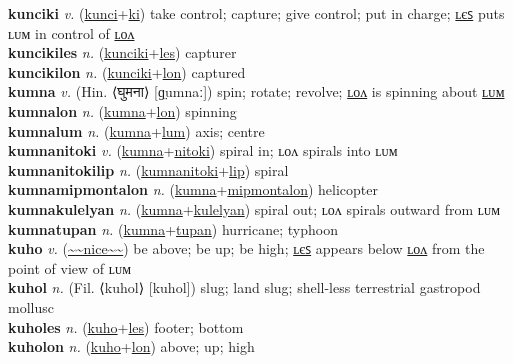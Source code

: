 \textbf{kunciki} \textit{v.} (\hyperref[kunci]{kunci}+\hyperref[ki]{ki})
take control; capture; give control; put in charge; \hyperref[kuncikiles]{ʟєꜱ} puts ʟᴜᴍ in control of \hyperref[kuncikilon]{ʟᴏᴧ} \label{kunciki} \\
\textbf{kuncikiles} \textit{n.} (\hyperref[kunciki]{kunciki}+\hyperref[les]{les})
capturer \label{kuncikiles} \\
\textbf{kuncikilon} \textit{n.} (\hyperref[kunciki]{kunciki}+\hyperref[lon]{lon})
captured \label{kuncikilon} \\
\textbf{kumna} \textit{v.} (Hin. ⟨घुमना⟩ [ɡ̤umnaː])
spin; rotate; revolve; \hyperref[kumnalon]{ʟᴏᴧ} is spinning about \hyperref[kumnalum]{ʟᴜᴍ} \label{kumna} \\
\textbf{kumnalon} \textit{n.} (\hyperref[kumna]{kumna}+\hyperref[lon]{lon})
spinning \label{kumnalon} \\
\textbf{kumnalum} \textit{n.} (\hyperref[kumna]{kumna}+\hyperref[lum]{lum})
axis; centre \label{kumnalum} \\
\textbf{kumnanitoki} \textit{v.} (\hyperref[kumna]{kumna}+\hyperref[nitoki]{nitoki})
spiral in; ʟᴏᴧ spirals into ʟᴜᴍ \label{kumnanitoki} \\
\textbf{kumnanitokilip} \textit{n.} (\hyperref[kumnanitoki]{kumnanitoki}+\hyperref[lip]{lip})
spiral \label{kumnanitokilip} \\
\textbf{kumnamipmontalon} \textit{n.} (\hyperref[kumna]{kumna}+\hyperref[mipmontalon]{mipmontalon})
helicopter \label{kumnamipmontalon} \\
\textbf{kumnakulelyan} \textit{n.} (\hyperref[kumna]{kumna}+\hyperref[kulelyan]{kulelyan})
spiral out; ʟᴏᴧ spirals outward from ʟᴜᴍ \label{kumnakulelyan} \\
\textbf{kumnatupan} \textit{n.} (\hyperref[kumna]{kumna}+\hyperref[tupan]{tupan})
hurricane; typhoon \label{kumnatupan} \\
\textbf{kuho} \textit{v.} (\hyperref[nice]{\~{}\~{}nice\~{}\~{}})
be above; be up; be high; \hyperref[kuholes]{ʟєꜱ} appears below \hyperref[kuholon]{ʟᴏᴧ} from the point of view of ʟᴜᴍ \label{kuho} \\
\textbf{kuhol} \textit{n.} (Fil. ⟨kuhol⟩ [kuhol])
slug; land slug; shell-less terrestrial gastropod mollusc \label{kuhol} \\
\textbf{kuholes} \textit{n.} (\hyperref[kuho]{kuho}+\hyperref[les]{les})
footer; bottom \label{kuholes} \\
\textbf{kuholon} \textit{n.} (\hyperref[kuho]{kuho}+\hyperref[lon]{lon})
above; up; high \label{kuholon} \\
